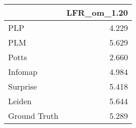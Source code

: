 \begin{tabular}{lr}
\toprule
{} & LFR_om_1.20 \\
\midrule
PLP          &       4.229 \\
PLM          &       5.629 \\
Potts        &       2.660 \\
Infomap      &       4.984 \\
Surprise     &       5.418 \\
Leiden       &       5.644 \\
Ground Truth &       5.289 \\
\bottomrule
\end{tabular}
